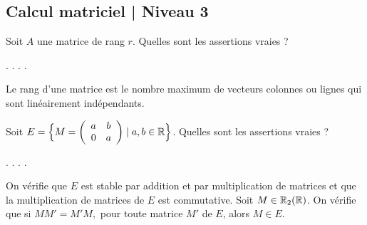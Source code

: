 \subsection{Calcul matriciel | Niveau 3}

\begin{question}
Soit $A$ une matrice de rang $r$. Quelles sont les assertions vraies ?
\begin{answers}  
.
.
.
.
\end{answers}
\begin{explanations} Le rang d'une matrice est le nombre maximum de vecteurs colonnes ou  lignes qui sont linéairement indépendants.
\end{explanations}
\end{question}

\begin{question}
Soit $E=\Big\{M = \left(\begin{array}{rc}a&b\\
0&a\end{array}\right)\mid a,b\in\mathbb{R} \Big\}$. Quelles sont les assertions vraies ?
\begin{answers}  
.
.
.
.
\end{answers}
\begin{explanations} On vérifie que $E$ est stable par addition et par multiplication de matrices et que la multiplication de matrices de $E$ est commutative.
\vskip0mm
Soit $M \in \mathbb{R}_2(\mathbb{R})$. On vérifie que si $MM'=M'M,$ pour toute matrice $M'$ de $ E$, alors $M\in E$.
\end{explanations}
\end{question}

